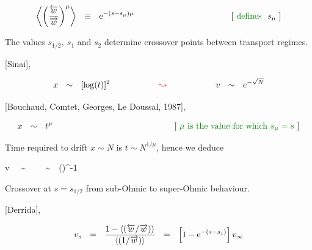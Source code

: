 \documentclass[12pt,fleqn]{seminar}
\begin{document}
\esl

\bslC





\Up

\[
\left\langle  \left(\frac{\overleftarrow{w}}{\overrightarrow{w}}\right)^{\mu}\right\rangle \ \ \equiv \ \ \eexp{-(s-s_{\mu})\mu} \hspace{4cm} [ \ \text{\cgreen{defines}} \ \ s_{\mu} \ ]
\]

{The values $s_{1/2},  \ s_1$ and  $s_2$ determine crossover points between transport regimes.}

\Dn

 [Sinai],
%

\Up

\[
{x} \ \ \sim \ \ [\log(t)]^2  \hspace{2cm} \cred{\leadsto} \hspace{2cm} v \ \ \sim \ \ e^{-\sqrt{N}}
\]

\Dn

%
  [Bouchaud, Comtet, Georges,  Le Doussal, 1987],
%

\Up


\[
{x} \ \ \sim \ \ t^{\mu} \hspace{5cm} [ \  \cgreen{\mu \text{ is the value for which} \ s_{\mu}=s} \ ]
\]

Time required to drift $x \sim N$ 
is $t \sim N^{1/\mu}$, hence we deduce

\Up

\beq
v \ \ \sim \ \  \ \ \sim \ \ \left(\right)^{-1} \ \ 
\eeq

Crossover at $s=s_{1/2}$ from sub-Ohmic to super-Ohmic behaviour.

\Dn

 [Derrida],

\Up

\[
v_s \ \ = \ \  
\frac{ 1 - \left\langle (\protect\overleftarrow{w}/\protect\overrightarrow{w})\right\rangle}
{\left\langle (1/\protect\overrightarrow{w}) \right\rangle}
\ \ = \ \ \left[1-\mbox{e}^{-(s-s_1)}\right] v_{\infty}  
\]

\esl

\bslC

\end{document}

